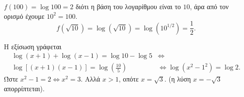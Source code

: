 \begin{alist}
\item $f(100) = \log 100 = 2$ διότι η βάση του λογαρίθμου είναι το $10$, άρα από τον ορισμό έχουμε $10^2 = 100$.
\[f(\sqrt{10}) = \log(\sqrt{10}) = \log\left(10^{1/2}\right) = \frac{1}{2}.\]
\item Η εξίσωση γράφεται 
\begin{align*}
\log(x + 1) + \log(x - 1) = \log 10 - \log 5 &\Leftrightarrow \\
\log[(x + 1)(x - 1)] = \log\left(\frac{10}{5}\right) &\Leftrightarrow \log(x^2 - 1^2) = \log 2.
\end{align*}
Ώστε $x^2 - 1 = 2 \Leftrightarrow x^2 = 3$. Αλλά $x > 1$, οπότε $x = \sqrt{3}$. (η λύση $x = -\sqrt{3}$ απορρίπτεται).
\end{alist}

